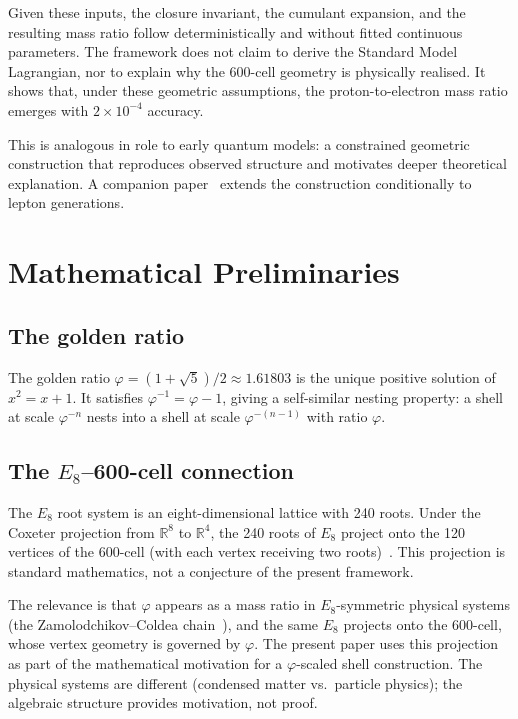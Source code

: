 \documentclass[12pt]{article}
\newcommand{\phig}{\varphi}
\begin{document}
Given these inputs, the closure invariant, the cumulant expansion, and the resulting mass ratio follow deterministically and without fitted continuous parameters. The framework does not claim to derive the Standard Model Lagrangian, nor to explain why the 600-cell geometry is physically realised. It shows that, under these geometric assumptions, the proton-to-electron mass ratio emerges with $2 \times 10^{-4}$ accuracy.

This is analogous in role to early quantum models: a constrained geometric construction that reproduces observed structure and motivates deeper theoretical explanation. A companion paper~\citep{SmartII} extends the construction conditionally to lepton generations.

\section{Mathematical Preliminaries}\label{sec:prelim}

\subsection{The golden ratio}

The golden ratio $\phig = (1+\sqrt{5})/2 \approx 1.61803$ is the unique positive solution of $x^2 = x + 1$. It satisfies $\phig^{-1} = \phig - 1$, giving a self-similar nesting property: a shell at scale $\phig^{-n}$ nests into a shell at scale $\phig^{-(n-1)}$ with ratio $\phig$.

\subsection{The $E_8$--600-cell connection}

The $E_8$ root system is an eight-dimensional lattice with 240 roots. Under the Coxeter projection from $\mathbb{R}^8$ to $\mathbb{R}^4$, the 240 roots of $E_8$ project onto the 120 vertices of the 600-cell (with each vertex receiving two roots)~\citep{Coxeter1973}. This projection is standard mathematics, not a conjecture of the present framework.

The relevance is that $\phig$ appears as a mass ratio in $E_8$-symmetric physical systems (the Zamolodchikov--Coldea chain~\citep{Zamolodchikov1989, Coldea2010}), and the same $E_8$ projects onto the 600-cell, whose vertex geometry is governed by $\phig$. The present paper uses this projection as part of the mathematical motivation for a $\phig$-scaled shell construction. The physical systems are different (condensed matter vs.\ particle physics); the algebraic structure provides motivation, not proof.
\end{document}
